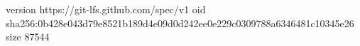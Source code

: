 version https://git-lfs.github.com/spec/v1
oid sha256:0b428e043d79e8521b189d4e09d0d242ee0e229c0309788a6346481c10345e26
size 87544
